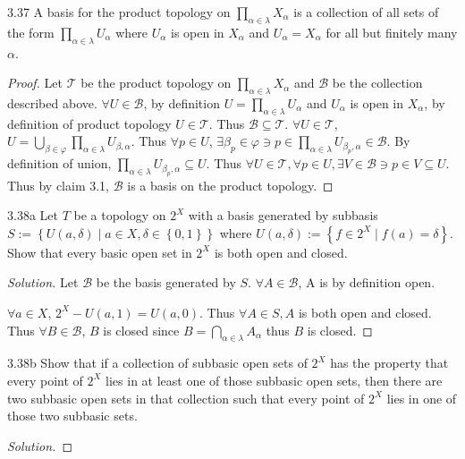\documentclass{article}
\newcommand*{\T}{\mathcal{T}}
\newcommand*{\B}{\mathcal{B}}
\newenvironment{solution}
{\renewcommand\qedsymbol{$\blacksquare$}\begin{proof}[Solution]}
{\end{proof}}
\begin{document}
\begin{claim}{3.37}\label{Claim 3.37.}
    A basis for the product topology on $\prod_{\alpha \in \lambda} X_\alpha$ is a collection of all sets of the form $\prod_{\alpha \in \lambda} U_\alpha$ where $U_\alpha$ is open in $X_\alpha$ and $U_\alpha = X_\alpha$ for all but finitely many $\alpha$.       
\end{claim}
\begin{proof}
    Let $\T$ be the product topology on $\prod_{\alpha \in \lambda} X_\alpha$ and $\B$ be the collection described above. $\forall U \in \B$, by definition $U = \prod_{\alpha \in \lambda} U_\alpha$ and $U_\alpha$ is open in $X_\alpha$, by definition of product topology $U \in \T$. Thus $\B \subseteq \T$. $\forall U \in \T$, $U = \bigcup_{\beta \in \varphi} \prod_{\alpha \in \lambda} U_{\beta, \alpha}$. Thus $\forall p \in U$, $\exists \beta_p \in \varphi \ni p \in \prod_{\alpha \in \lambda} U_{\beta_p, \alpha} \in \B$. By definition of union,  $\prod_{\alpha \in \lambda} U_{\beta_p, \alpha} \subseteq U$. Thus $\forall U \in \T, \forall p \in U, \exists V \in \B \ni p \in V \subseteq U$. Thus by claim 3.1, $\B$ is a basis on the product topology.    
\end{proof}

\bigskip

\begin{PROB}{3.38a}\label{Problem 3.38a.}
    Let $T$ be a topology on $2^X$ with a basis generated by subbasis $S:= \left\{ U(a, \delta)  \mid a \in X, \delta \in \left\{ 0, 1 \right\}\right\}$ where $U(a, \delta) := \left\{ f \in 2^X \mid f(a) = \delta \right\}$. Show that every basic open set in $2^X$ is both open and closed.   
\end{PROB}
\begin{solution}
    Let $\B$ be the basis generated by $S$. $\forall A \in \B$, A is by definition open. 
    
    $\forall a \in X$, $2^X - U(a, 1) = U(a, 0)$. Thus $\forall A \in S, A$ is both open and closed. Thus $\forall B \in \B$, $B$ is closed since $B = \bigcap_{\alpha \in \lambda} A_\alpha$ thus $B$ is closed. 
\end{solution}
\begin{PROB}{3.38b}\label{Problem 3.38b.}
    Show that if a collection of subbasic open sets of $2^X$  has the property that every point of $2^X$  lies in at least one of those subbasic open sets, then there are two subbasic open sets in that collection such that every point of $2^X$  lies in one of those two subbasic sets.
\end{PROB}
\begin{solution}
    
\end{solution}
\end{document}
